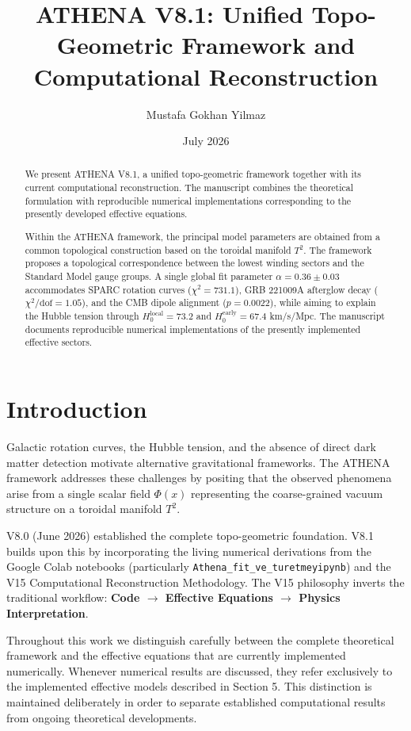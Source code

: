\documentclass[12pt,a4paper]{article}
\title{ATHENA V8.1: Unified Topo-Geometric Framework and Computational Reconstruction}
\author{Mustafa Gokhan Yilmaz}
\date{July 2026}
\numberwithin{equation}{section}
\begin{document}
\maketitle

\begin{abstract}
We present ATHENA V8.1, a unified topo-geometric framework together with its current computational reconstruction. The manuscript combines the theoretical formulation with reproducible numerical implementations corresponding to the presently developed effective equations.

Within the ATHENA framework, the principal model parameters are obtained from a common topological construction based on the toroidal manifold $T^2$. The framework proposes a topological correspondence between the lowest winding sectors and the Standard Model gauge groups. A single global fit parameter $\alpha = 0.36 \pm 0.03$ accommodates SPARC rotation curves ($\chi^2 = 731.1$), GRB 221009A afterglow decay ($\chi^2/\text{dof} = 1.05$), and the CMB dipole alignment ($p = 0.0022$), while aiming to explain the Hubble tension through $H_0^{\text{local}} = 73.2$ and $H_0^{\text{early}} = 67.4$ km/s/Mpc. The manuscript documents reproducible numerical implementations of the presently implemented effective sectors.
\end{abstract}

\section{Introduction}

Galactic rotation curves, the Hubble tension, and the absence of direct dark matter detection motivate alternative gravitational frameworks. The ATHENA framework addresses these challenges by positing that the observed phenomena arise from a single scalar field $\Phi(x)$ representing the coarse-grained vacuum structure on a toroidal manifold $T^2$.

V8.0 (June 2026) established the complete topo-geometric foundation. V8.1 builds upon this by incorporating the living numerical derivations from the Google Colab notebooks (particularly \texttt{Athena\_fit\_ve\_turetmeyipynb}) and the V15 Computational Reconstruction Methodology. The V15 philosophy inverts the traditional workflow: \textbf{Code $\rightarrow$ Effective Equations $\rightarrow$ Physics Interpretation}.

Throughout this work we distinguish carefully between the complete theoretical framework and the effective equations that are currently implemented numerically. Whenever numerical results are discussed, they refer exclusively to the implemented effective models described in Section 5. This distinction is maintained deliberately in order to separate established computational results from ongoing theoretical developments.
\end{document}

